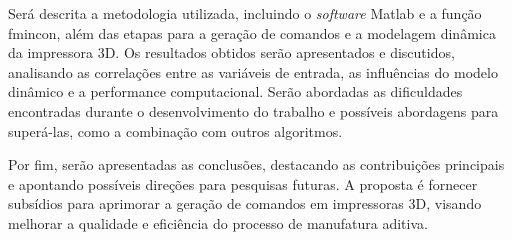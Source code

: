 Será descrita a metodologia utilizada, incluindo o \textit{software} Matlab e a função fmincon, além das etapas para a geração de comandos e a modelagem dinâmica da impressora 3D. Os resultados obtidos serão apresentados e discutidos, analisando as correlações entre as variáveis de entrada, as influências do modelo dinâmico e a performance computacional. Serão abordadas as dificuldades encontradas durante o desenvolvimento do trabalho e possíveis abordagens para superá-las, como a combinação com outros algoritmos.

Por fim, serão apresentadas as conclusões, destacando as contribuições principais e apontando possíveis direções para pesquisas futuras. A proposta é fornecer subsídios para aprimorar a geração de comandos em impressoras 3D, visando melhorar a qualidade e eficiência do processo de manufatura aditiva.